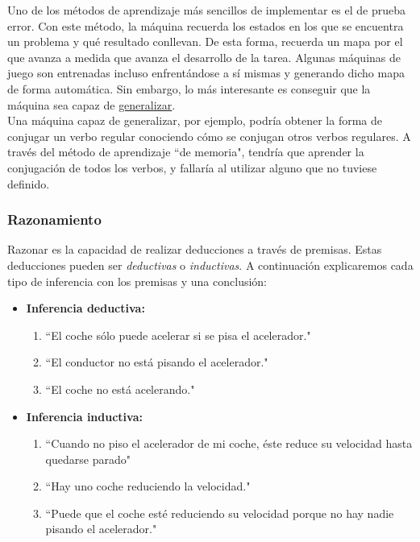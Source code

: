\documentclass[a4paper]{article}
\begin{document}
    Uno de los métodos de aprendizaje más sencillos de implementar es el de prueba error. Con este método, la máquina recuerda los estados en los que se encuentra un problema y qué resultado conllevan. De esta forma, recuerda un mapa por el que avanza a medida que avanza el desarrollo de la tarea. Algunas máquinas de juego son entrenadas incluso enfrentándose a sí mismas y generando dicho mapa de forma automática. Sin embargo, lo más interesante es conseguir que la máquina sea capaz de \underline{generalizar}.\\

    Una máquina capaz de generalizar, por ejemplo, podría obtener la forma de conjugar un verbo regular conociendo cómo se conjugan otros verbos regulares. A través del método de aprendizaje ``de memoria", tendría que aprender la conjugación de todos los verbos, y fallaría al utilizar alguno que no tuviese definido.

    \subsubsection*{Razonamiento}

    Razonar es la capacidad de realizar deducciones a través de premisas. Estas deducciones pueden ser \emph{deductivas} o \emph{inductivas}. A continuación explicaremos cada tipo de inferencia con los premisas y una conclusión:

    \begin{itemize}
        \item \textbf{Inferencia deductiva:}
        \begin{enumerate}
            \item ``El coche sólo puede acelerar si se pisa el acelerador."
            \item ``El conductor no está pisando el acelerador."
            \item ``El coche no está acelerando."
        \end{enumerate}
        \item \textbf{Inferencia inductiva:}
        \begin{enumerate}
            \item ``Cuando no piso el acelerador de mi coche, éste reduce su velocidad hasta quedarse parado"
            \item ``Hay uno coche reduciendo la velocidad."
            \item ``Puede que el coche esté reduciendo su velocidad porque no hay nadie pisando el acelerador."
        \end{enumerate}
    \end{itemize}
\end{document}

